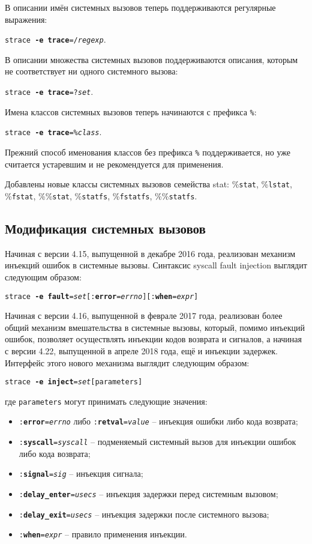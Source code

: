 \documentclass[10pt, a5paper]{article}
\begin{document}
В описании имён системных вызовов теперь поддерживаются регулярные выражения:

\texttt{strace \textbf{-e trace}=/\textit{regexp}}.

В описании множества системных вызовов поддерживаются описания, которым не соответствует ни одного системного вызова:

\texttt{strace \textbf{-e trace}=?\textit{set}}.

Имена классов системных вызовов теперь начинаются с префикса \texttt{\%}:

\texttt{strace \textbf{-e trace}=\%\textit{class}}.

Прежний способ именования классов без префикса \texttt{\%} поддерживается, но уже считается устаревшим и не рекомендуется для применения.

Добавлены новые классы системных вызовов семейства stat: 
\%\texttt{stat}, 
\%\texttt{lstat}, 
\%\texttt{fstat}, 
\%\%\texttt{stat}, 
\%\texttt{statfs}, 
\%\texttt{fstatfs}, 
\%\%\texttt{statfs}.

\subsection*{Модификация системных вызовов} 
Начиная с версии 4.15, выпущенной в декабре 2016 года, реализован механизм инъекций ошибок в системные вызовы. 
Синтаксис syscall fault injection выглядит следующим образом:

\texttt{strace \textbf{-e fault}=\textit{set}[:\textbf{error}=\textit{errno}][:\textbf{when}=\textit{expr}]}

Начиная с версии 4.16, выпущенной в феврале 2017 года, реализован более общий механизм вмешательства в системные вызовы, который, помимо инъекций ошибок, позволяет осуществлять инъекции кодов возврата и сигналов, а начиная с версии 4.22, выпущенной в апреле 2018 года, ещё и инъекции задержек. 
Интерфейс этого нового механизма выглядит следующим образом:

\texttt{strace \textbf{-e inject}=\textit{set}[parameters]}

где \texttt{parameters} могут принимать следующие значения: 
\begin{itemize} 
\item \texttt{:\textbf{error}=\textit{errno}} либо \texttt{:\textbf{retval}=\textit{value}} -- 
инъекция ошибки либо кода возврата; 
\item \texttt{:\textbf{syscall}=\textit{syscall}} -- 
подменяемый системный вызов для инъекции ошибок либо кода возврата; 
\item \texttt{:\textbf{signal}=\textit{sig}} -- 
инъекция сигнала; 
\item \texttt{:\textbf{delay\_enter}=\textit{usecs}} -- 
инъекция задержки перед системным вызовом; 
\item \texttt{:\textbf{delay\_exit}=\textit{usecs}} -- 
инъекция задержки после системного вызова; 
\item \texttt{:\textbf{when}=\textit{expr}} -- 
правило применения инъекции. 
\end{itemize}
\end{document}
